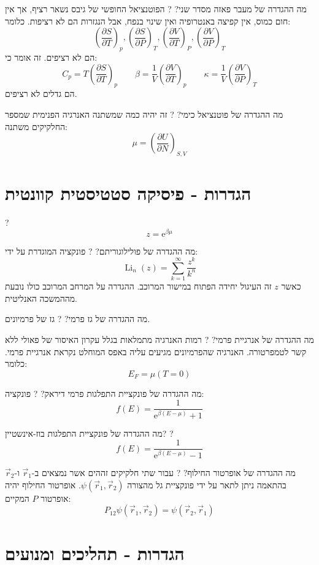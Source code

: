 \documentclass{tstextbook}
\begin{document}
מה ההגדרה של מעבר פאזה מסדר שני?
?
הפוטנציאל החופשי של גיבס נשאר רציף, אך אין חום כמוס, אין קפיצה באנטרופיה ואין שינוי בנפח, אבל הנגזרות הם לא רציפות. כלומר:
$$\left( \frac{\partial S}{\partial T}  \right)_{p},\left( \frac{\partial S}{\partial P}  \right)_{T},\left( \frac{\partial V}{\partial T}  \right)_{P},\left( \frac{\partial V}{\partial P}  \right)_{T}$$
הם לא רציפים. זה אומר כי:
$$C_{p}=T\left( \frac{\partial S}{\partial T}  \right)_{p}\qquad \beta=\frac{1}{V}\left( \frac{\partial V}{\partial T}  \right)_{p}\qquad \kappa=\frac{1}{V}\left( \frac{\partial V}{\partial P}  \right)_{T}$$
הם גדלים לא רציפים.

מה ההגדרה של פוטנציאל כימי?
?
זה יהיה כמה שמשתנה האנרגיה הפנימית שמספר החלקיקים משתנה:
$$\mu\!=\!\left({\frac{\partial U}{\partial N}}\right)_{S,V}$$

\section{הגדרות - פיסיקה סטטיסטית קוונטית}

?
$$z=\mathrm{e}^{\beta\mu}$$

מה ההגדרה של פולילוגוריתם?
?
פונקציה המוגדרת על ידי:
$$\operatorname{Li}_{n}(z)=\sum_{k=1}^{\infty}{\frac{z^{k}}{k^{n}}}$$
כאשר \(z\) זה העיגול יחידה הפתוח במישור המרוכב. ההגדרה על המרחב המרוכב כולו נובעת מההמשכה האנליטית.

מה ההגדרה של גז פרמי?
?
גז של פרמיונים.

מה ההגדרה של אנרגיית פרמי?
?
רמות האנרגיה מתמלאות בגלל עקרון האיסור של פאולי ללא קשר לטמפרטורה. האנרגיה שהפרמיונים מגיעים עליה באפס המוחלט נקראת אנרגיית פרמי. כלומר:
$$E_{F}=\mu(T=0)$$

מה ההגדרה של פונקציית התפלגות פרמי דיראק?
?
פונקציה:
$$f(E)=\frac{1}{\mathrm{e}^{\beta(E-\mu)}+1}$$

מה ההגדרה של פונקציית התפלגות בוז-אינשטיין?
?
$$f(E)=\frac{1}{\mathrm{e}^{\beta(E-\mu)}-1}$$

מה ההגדרה של אופרטור החילוף?
?
עבור שתי חלקיקים זההים אשר נמצאים ב-\(\vec{r}_{1}\) ו-\(\vec{r}_{2}\) בהתאמה ניתן לתאר על ידי פונקציית גל מהצורה \(\psi\left( \vec{r}_{1},\vec{r}_{2} \right)\). אופרטור החילוף יהיה אופרטור \(P\) המקיים:
$$P_{12}\psi\left( \vec{r}_{1},\vec{r}_{2} \right)=\psi\left( \vec{r}_{2},\vec{r}_{1} 
\right)$$

\section{הגדרות - תהליכים ומנועים}
\end{document}
